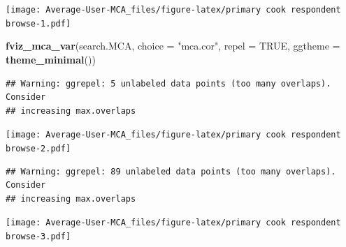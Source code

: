 \documentclass[
]{article}
\newenvironment{Shaded}{\begin{snugshade}}{\end{snugshade}}
\newcommand{\DataTypeTok}[1]{\textcolor[rgb]{0.13,0.29,0.53}{#1}}
\newcommand{\KeywordTok}[1]{\textcolor[rgb]{0.13,0.29,0.53}{\textbf{#1}}}
\newcommand{\NormalTok}[1]{#1}
\newcommand{\OtherTok}[1]{\textcolor[rgb]{0.56,0.35,0.01}{#1}}
\newcommand{\StringTok}[1]{\textcolor[rgb]{0.31,0.60,0.02}{#1}}
\begin{document}
\texttt{[image: Average-User-MCA\_files/figure-latex/primary cook respondent browse-1.pdf]}

\begin{Shaded}
\begin{Highlighting}[]
\KeywordTok{fviz_mca_var}\NormalTok{(search.MCA, }\DataTypeTok{choice =} \StringTok{"mca.cor"}\NormalTok{, }\DataTypeTok{repel =} \OtherTok{TRUE}\NormalTok{,}
             \DataTypeTok{ggtheme =} \KeywordTok{theme_minimal}\NormalTok{())}
\end{Highlighting}
\end{Shaded}

\begin{verbatim}
## Warning: ggrepel: 5 unlabeled data points (too many overlaps). Consider
## increasing max.overlaps
\end{verbatim}

\texttt{[image: Average-User-MCA\_files/figure-latex/primary cook respondent browse-2.pdf]}

\begin{Shaded}
\end{Shaded}

\begin{verbatim}
## Warning: ggrepel: 89 unlabeled data points (too many overlaps). Consider
## increasing max.overlaps
\end{verbatim}

\texttt{[image: Average-User-MCA\_files/figure-latex/primary cook respondent browse-3.pdf]}
\end{document}

